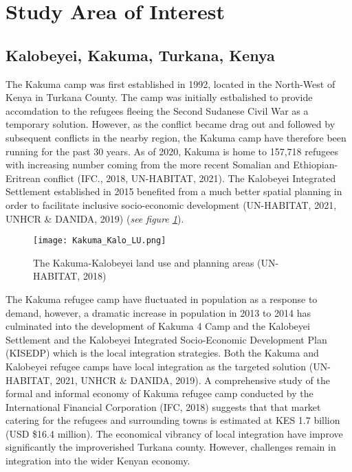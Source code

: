\documentclass[11pt, a4paper, twoside]{report}
\begin{document}
\section{Study Area of Interest}\label{StudyAOI}
\subsection{Kalobeyei, Kakuma, Turkana, Kenya}\label{Kalobeyei}

The Kakuma camp was first established in 1992, located in the North-West of Kenya in Turkana County. The camp was initially estbalished to provide accomdation to the refugees fleeing the Second Sudanese Civil War as a temporary solution. However, as the conflict became drag out and followed by subsequent conflicts in the nearby region, the Kakuma camp have therefore been running for the past 30 years. As of 2020, Kakuma is home to 157,718 refugees with increasing number coming from the more recent Somalian and Ethiopian-Eritrean conflict (IFC., 2018, UN-HABITAT, 2021). The Kalobeyei Integrated Settlement established in 2015 benefited from a much better spatial planning in order to facilitate inclusive socio-economic development (UN-HABITAT, 2021, UNHCR \& DANIDA, 2019) (\textit{see figure \ref{fig:KU_KALO_LU}}).\\\par

\newpage

\begin{figure}[h]
  \centering
  \texttt{[image: Kakuma\_Kalo\_LU.png]}
  \caption{The Kakuma-Kalobeyei land use and planning areas (UN-HABITAT, 2018)}
  \label{fig:KU_KALO_LU}
\end{figure}

\newpage

The Kakuma refugee camp have fluctuated in population as a response to demand, however, a dramatic increase in population in 2013 to 2014 has culminated into the development of Kakuma 4 Camp and the Kalobeyei Settlement and the Kalobeyei Integrated Socio-Economic Development Plan (KISEDP) which is the local integration strategies. Both the Kakuma and Kalobeyei refugee camps have local integration as the targeted solution (UN-HABITAT, 2021, UNHCR \& DANIDA, 2019). A comprehensive study of the formal and informal economy of Kakuma refugee camp conducted by the International Financial Corporation (IFC, 2018) suggests that that market catering for the refugees and surrounding towns is estimated at KES 1.7 billion (USD \$16.4 million). The economical vibrancy of local integration have improve significantly the improverished Turkana county. However, challenges remain in integration into the wider Kenyan economy.
\end{document}
